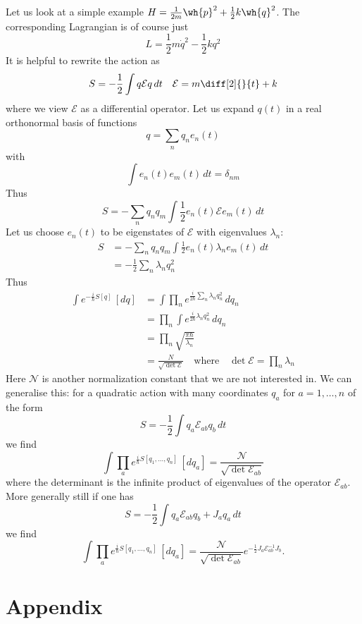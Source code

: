 \documentclass[12pt, a4paper]{article}
\begin{document}
Let us look at a simple example \( H = \frac{1}{2m}\wh{p}^2 + \frac{1}{2}k\wh{q}^2 \). The corresponding Lagrangian is of course just
\[ L = \frac{1}{2}m\dot{q}^2 - \frac{1}{2}kq^2 \]
It is helpful to rewrite the action as
\[ S = -\frac{1}{2} \int q\mathcal{E}q \, dt \quad \mathcal{E} = m\diff[2]{}{t} + k \]
where we view \( \mathcal{E} \) as a differential operator. Let us expand \( q(t) \) in a real orthonormal basis of functions
\[ q = \sum_n q_n e_n(t) \]
with
\[ \int e_n(t)e_m(t) \, dt = \delta_{nm} \]
Thus
\[ S = -\sum_{n} q_n q_m \int \frac{1}{2} e_n(t)\mathcal{E}e_m(t) \, dt \]
Let us choose \( e_n(t) \) to be eigenstates of \( \mathcal{E} \) with eigenvalues \( \lambda_n \):
\[ \begin{aligned}
    S &= -\sum_{n} q_n q_m \int \frac{1}{2} e_n(t) \lambda_n e_m(t) \, dt \\
    &= -\frac{1}{2} \sum_n \lambda_n q_n^2 
\end{aligned}\]
Thus
\[ \begin{aligned}
    \int e^{-\frac{i}{\hbar}S[q]}\, [dq] &= \int \prod_n  e^{\frac{i}{2\hbar} \sum_n \lambda_n q_n^2} \, dq_n \\
    &= \prod_n \int  e^{\frac{i}{2\hbar} \lambda_n q_n^2} \, dq_n \\
    &= \prod_n \sqrt{\frac{\pi \hbar}{\lambda_n}} \\
    &= \frac{N}{\sqrt{\det \mathcal{E}}} \quad \text{where} \quad \det \mathcal{E} = \prod_n \lambda_n 
\end{aligned}\]
Here \( \mathcal{N} \) is another normalization constant that we are not interested in.
We can generalise this: for a quadratic action with many coordinates \( q_a\) for \(a = 1, \ldots, n \) of the form
\[ S = -\frac{1}{2} \int q_a \mathcal{E}_{ab} q_b \, dt \]
we find
\[ \int \prod_a e^{\frac{i}{\hbar}S[q_1,\ldots,q_n]} \, [dq_a] = \frac{\mathcal{N}}{\sqrt{\det \mathcal{E}_{ab}}} \]
where the determinant is the infinite product of eigenvalues of the operator \( \mathcal{E}_{ab} \). More generally still if one has
\[ S = -\frac{1}{2} \int q_a \mathcal{E}_{ab} q_b + J_a q_a \, dt \]
we find
\[ \int \prod_a e^{\frac{i}{\hbar}S[q_1,\ldots,q_n]} \, [dq_a]= \frac{\mathcal{N}}{\sqrt{\det \mathcal{E}_{ab}}} e^{-\frac{1}{2} J_a \mathcal{E}^{-1}_{ab} J_b}.\]



\pagebreak

\appendix

\section*{Appendix}
\end{document}
